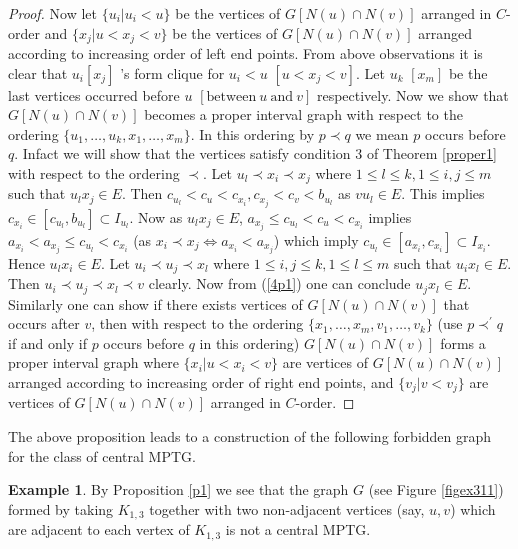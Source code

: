 \documentclass{article}
\theoremstyle{definition}
\newtheorem{exmp}[thm]{Example}
\numberwithin{equation}{section}
\begin{document}
\begin{proof}
\vspace{0.5 em}\noindent 
Now let $\{u_{i}|u_{i}<u\}$ be the vertices of $G[N(u)\cap N(v)]$ arranged in $C$-order and $\{x_{j}|u<x_{j}<v\}$ be the vertices of $G[N(u)\cap N(v)]$ arranged according to increasing order of left end points. From above observations it is clear that $u_{i}\left[x_{j}\right]$ 's form clique for $u_{i}<u$ $\left[u<x_{j}<v\right]$. Let $u_{k}$ $\left[x_{m}\right]$ be the last vertices occurred before $u$ $\left[ \textrm{between} \ u \ \textrm{and}\  v\right]$ respectively. Now we show that $G[N(u)\cap N(v)]$ becomes a proper interval graph with respect to the ordering $\{u_{1},\hdots,u_{k},x_{1},\hdots,x_{m}\}$. In this ordering by $p \prec q$ we mean $p$ occurs before $q$. Infact we will show that the vertices satisfy condition $3$ of Theorem \ref{proper1} with respect to the ordering $\prec$. Let $u_{l}\prec x_{i} \prec x_{j}$ where $1\leq l \leq k,1\leq i,j\leq m $ such that $u_{l}x_{j}\in E$. Then $c_{u_l}<c_{u}<c_{x_{i}},c_{x_{j}}<c_{v}<b_{u_l}$ as $vu_{l}\in E$. This implies $c_{x_{i}}\in[c_{u_l},b_{u_l}]\subset I_{u_l}$. Now as $u_{l}x_{j}\in E$, $a_{x_{j}}\leq c_{u_l}<c_{u}<c_{x_{i}}$ implies $a_{x_{i}}<a_{x_{j}}\leq c_{u_l}<c_{x_{i}}$ (as $x_{i}\prec x_{j}\Longleftrightarrow a_{x_{i}}<a_{x_{j}}$) which imply $c_{u_l}\in [a_{x_{i}},c_{x_{i}}]\subset I_{x_{i}}$. Hence $u_{l}x_{i}\in E$. Let $u_{i}\prec u_{j}\prec x_{l}$ where $1\leq i,j\leq k,1\leq l\leq m$ such that $u_{i}x_{l}\in E$. Then $u_{i}\prec u_{j}\prec x_{l}\prec v$ clearly. Now from  (\ref{4p1}) one can conclude $u_{j}x_{l}\in E$. Similarly one can show if there exists vertices of $G[N(u)\cap N(v)]$ that occurs after $v$, then with respect to the ordering $\{x_{1},\hdots,x_{m},v_{1},\hdots,v_{k}\}$ (use $p\prec^{'}q$ if and only if $p$ occurs before $q$ in this ordering) $G[N(u)\cap N(v)]$ forms a proper interval graph where $\{x_{i}|u<x_{i}<v\}$ are vertices of $G[N(u)\cap N(v)]$ arranged according to increasing order of right end points, and $\{v_{j}|v<v_{j}\}$ are vertices of $G[N(u)\cap N(v)]$ arranged in $C$-order.
\end{proof}

\noindent
The above proposition leads to a construction of the following forbidden graph for the class of central MPTG.

\begin{exmp}\label{notcmptg}
By Proposition \ref{p1} we see that the graph $G$ (see Figure \ref{figex311}) formed by taking $K_{1,3}$ together with two non-adjacent vertices (say, $u,v$) which are adjacent to each vertex of $K_{1,3}$ is not a central MPTG.
\end{exmp} 
\end{document}
